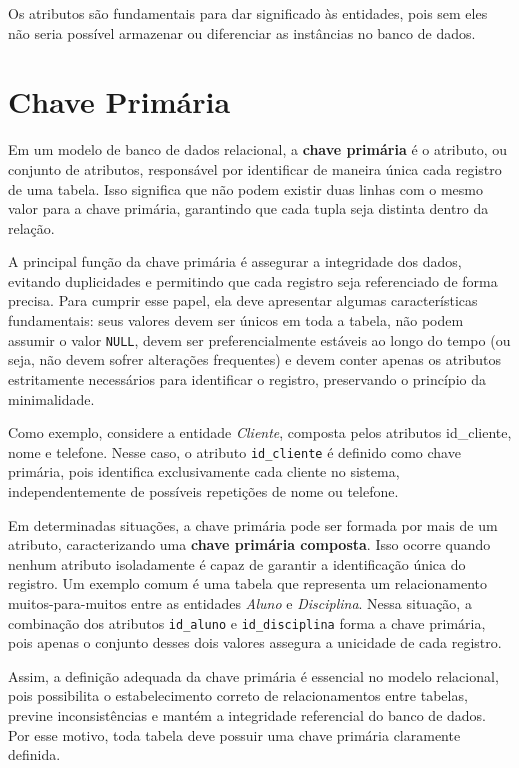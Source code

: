 \documentclass[12pt,a4paper,openright]{book}
\begin{document}
Os atributos são fundamentais para dar significado às entidades, pois sem eles não seria possível armazenar ou diferenciar as instâncias no banco de dados.

\section{Chave Primária}

Em um modelo de banco de dados relacional, a \textbf{chave primária} é o atributo, ou conjunto de atributos, responsável por identificar de maneira única cada registro de uma tabela. Isso significa que não podem existir duas linhas com o mesmo valor para a chave primária, garantindo que cada tupla seja distinta dentro da relação.

A principal função da chave primária é assegurar a integridade dos dados, evitando duplicidades e permitindo que cada registro seja referenciado de forma precisa. Para cumprir esse papel, ela deve apresentar algumas características fundamentais: seus valores devem ser únicos em toda a tabela, não podem assumir o valor \texttt{NULL}, devem ser preferencialmente estáveis ao longo do tempo (ou seja, não devem sofrer alterações frequentes) e devem conter apenas os atributos estritamente necessários para identificar o registro, preservando o princípio da minimalidade.

Como exemplo, considere a entidade \textit{Cliente}, composta pelos atributos id\_cliente, nome e telefone. Nesse caso, o atributo \texttt{id\_cliente} é definido como chave primária, pois identifica exclusivamente cada cliente no sistema, independentemente de possíveis repetições de nome ou telefone.

Em determinadas situações, a chave primária pode ser formada por mais de um atributo, caracterizando uma \textbf{chave primária composta}. Isso ocorre quando nenhum atributo isoladamente é capaz de garantir a identificação única do registro. Um exemplo comum é uma tabela que representa um relacionamento muitos-para-muitos entre as entidades \textit{Aluno} e \textit{Disciplina}. Nessa situação, a combinação dos atributos \texttt{id\_aluno} e \texttt{id\_disciplina} forma a chave primária, pois apenas o conjunto desses dois valores assegura a unicidade de cada registro.

Assim, a definição adequada da chave primária é essencial no modelo relacional, pois possibilita o estabelecimento correto de relacionamentos entre tabelas, previne inconsistências e mantém a integridade referencial do banco de dados. Por esse motivo, toda tabela deve possuir uma chave primária claramente definida.
\end{document}
